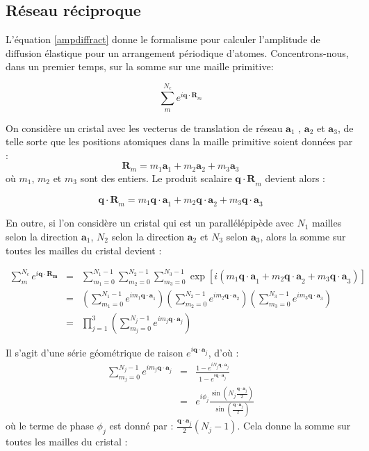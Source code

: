 \subsection{Réseau réciproque}

L'équation \ref{ampdiffract} donne le formalisme pour calculer l'amplitude de
diffusion élastique pour un arrangement périodique d'atomes. Concentrons-nous,
dans un premier temps, sur la somme sur une maille primitive:

\begin{equation}
    \sum_m^{N_c} e^{i\mathbf{q\cdot R}_m}
\end{equation}

On considère un cristal avec les vecterus de translation de réseau $\mathbf{a}_1$
, $\mathbf{a}_2$ et $\mathbf{a}_3$, de telle sorte que les positions atomiques
dans la maille primitive soient données par :
\begin{equation}
    \mathbf{R}_m = m_1 \mathbf{a}_1 + m_2 \mathbf{a}_2 + m_3 \mathbf{a}_3
\end{equation}
où $m_1$, $m_2$ et $m_3$ sont des entiers. Le produit scalaire 
$\mathbf{q\cdot R}_m$ devient alors :

\begin{equation}
    \mathbf{q\cdot R}_m = m_1 \mathbf{q \cdot a}_1 + m_2 \mathbf{q \cdot a}_2 + m_3 \mathbf{q \cdot a}_3
\end{equation}

En outre, si l'on considère un cristal qui est un parallélépipède avec $N_1$
mailles selon la direction $\mathbf{a}_1$, $N_2$ selon la direction $\mathbf{a}_2$
et $N_3$ selon $\mathbf{a}_3$, alors la somme sur toutes les mailles du cristal
devient :

\begin{eqnarray}
    \sum_m^{N_c} e^{i \mathbf{q\cdot R_m}} & = &
        \sum_{m_1 = 0}^{N_1 - 1} \sum_{m_2 = 0}^{N_2 - 1} \sum_{m_3 = 0}^{N_3 - 1}
        \exp [i(m_1 \mathbf{q \cdot a}_1 + m_2 \mathbf{q \cdot a}_2 + m_3 \mathbf{q \cdot a}_3)]\\
        & = & \left( \sum_{m_1 = 0}^{N_1 - 1} e^{i m_1 \mathbf{q\cdot a}_1} \right) 
        \left( \sum_{m_2 = 0}^{N_2-1} e^{i m_2 \mathbf{q\cdot a}_2} \right)
        \left( \sum_{m_3 = 0}^{N_3-1} e^{i m_3 \mathbf{q\cdot a}_3} \right)\\
        & = & \prod_{j=1}^3 \left( \sum_{m_j = 0}^{N_j -1} e^{i m_j \mathbf{q\cdot a}_j} \right)
    \end{eqnarray}

Il s'agit d'une série géométrique de raison $e^{i \mathbf{q\cdot a}_j}$, d'où :
\begin{eqnarray}
    \sum_{m_j = 0}^{N_j - 1} e^{i m_j \mathbf{q\cdot a}_j} & = &
    \frac{1 - e^{i N_j \mathbf{q\cdot a}_j}}{1 - e^{i \mathbf{q \cdot a}_j}} \\
    & = & e^{i \phi_j} \frac{\sin \left( N_j \frac{\mathbf{q\cdot a}_j}{2} \right) }{\sin \left( \frac{\mathbf{q\cdot a}_j}{2} \right)}
\end{eqnarray}
où le terme de phase $\phi_j$ est donné par : $\frac{\mathbf{q\cdot a}_j}{2} (N_j
-1)$. Cela donne la somme sur toutes les mailles du cristal :

